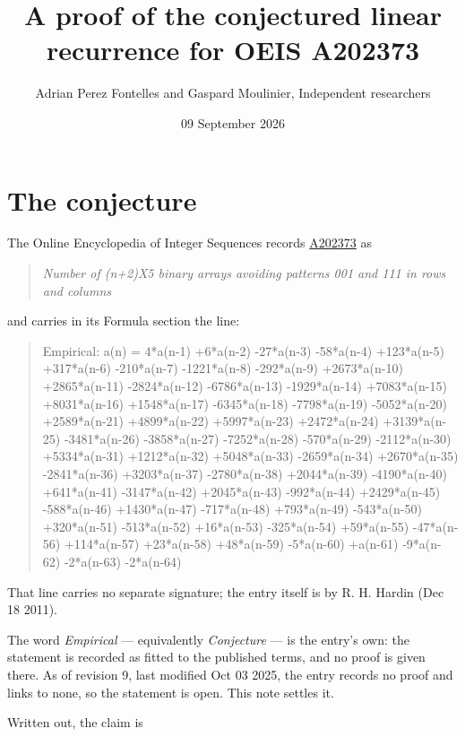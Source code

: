 \documentclass[11pt]{article}
\title{A proof of the conjectured linear recurrence for OEIS A202373}
\author{Adrian Perez Fontelles and Gaspard Moulinier, Independent researchers}
\date{09 September 2026}
\theoremstyle{definition}
\begin{document}
\maketitle
\section{The conjecture}

The Online Encyclopedia of Integer Sequences records \href{https://oeis.org/A202373}{A202373} as

\begin{quote}\itshape Number of (n+2)X5 binary arrays avoiding patterns 001 and 111 in rows and columns\end{quote}

and carries in its Formula section the line:

\begin{quote}\ttfamily Empirical: a(n) = 4*a(n-1) +6*a(n-2) -27*a(n-3) -58*a(n-4) +123*a(n-5) +317*a(n-6) -210*a(n-7) -1221*a(n-8) -292*a(n-9) +2673*a(n-10) +2865*a(n-11) -2824*a(n-12) -6786*a(n-13) -1929*a(n-14) +7083*a(n-15) +8031*a(n-16) +1548*a(n-17) -6345*a(n-18) -7798*a(n-19) -5052*a(n-20) +2589*a(n-21) +4899*a(n-22) +5997*a(n-23) +2472*a(n-24) +3139*a(n-25) -3481*a(n-26) -3858*a(n-27) -7252*a(n-28) -570*a(n-29) -2112*a(n-30) +5334*a(n-31) +1212*a(n-32) +5048*a(n-33) -2659*a(n-34) +2670*a(n-35) -2841*a(n-36) +3203*a(n-37) -2780*a(n-38) +2044*a(n-39) -4190*a(n-40) +641*a(n-41) -3147*a(n-42) +2045*a(n-43) -992*a(n-44) +2429*a(n-45) -588*a(n-46) +1430*a(n-47) -717*a(n-48) +793*a(n-49) -543*a(n-50) +320*a(n-51) -513*a(n-52) +16*a(n-53) -325*a(n-54) +59*a(n-55) -47*a(n-56) +114*a(n-57) +23*a(n-58) +48*a(n-59) -5*a(n-60) +a(n-61) -9*a(n-62) -2*a(n-63) -2*a(n-64)\end{quote}

That line carries no separate signature; the entry itself is by R. H. Hardin (Dec 18 2011).

The word {\itshape Empirical} --- equivalently {\itshape Conjecture} --- is the entry's own: the statement is recorded as fitted to the published terms, and no proof is given there. As of revision 9, last modified Oct 03 2025, the entry records no proof and links to none, so the statement is open. This note settles it.

Written out, the claim is
\end{document}
